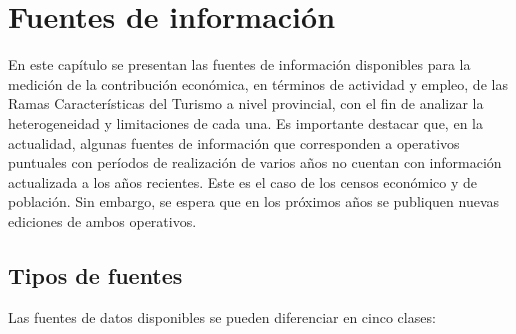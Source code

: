 \documentclass[
  openany]{book}
\begin{document}
\hypertarget{fuentes-informacion}{%
\chapter{\texorpdfstring{\textbf{Fuentes de información}}{Fuentes de información}}\label{fuentes-informacion}}

En este capítulo se presentan las fuentes de información disponibles para la medición de la contribución económica, en términos de actividad y empleo, de las Ramas Características del Turismo a nivel provincial, con el fin de analizar la heterogeneidad y limitaciones de cada una.
Es importante destacar que, en la actualidad, algunas fuentes de información que corresponden a operativos puntuales con períodos de realización de varios años no cuentan con información actualizada a los años recientes.
Este es el caso de los censos económico y de población.
Sin embargo, se espera que en los próximos años se publiquen nuevas ediciones de ambos operativos.

\hypertarget{tipos-de-fuentes}{%
\section{Tipos de fuentes}\label{tipos-de-fuentes}}

Las fuentes de datos disponibles se pueden diferenciar en cinco clases:
\end{document}
